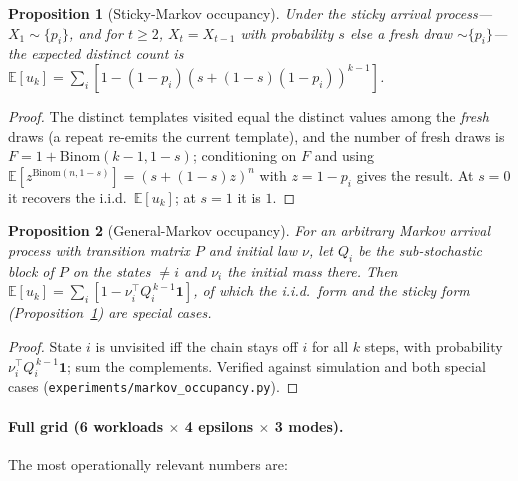 \documentclass[sigconf,nonacm]{acmart}
\newcommand{\E}{\mathbb{E}}
\newtheorem{prop}{Proposition}
\begin{document}
\begin{prop}[Sticky-Markov occupancy]\label{prop:sticky}
Under the sticky arrival process---$X_1\sim\{p_i\}$, and for $t\ge2$, $X_t{=}X_{t-1}$ with probability $s$ else a fresh draw $\sim\{p_i\}$---the expected distinct count is
$\E[u_k]=\sum_i[1-(1-p_i)(s+(1-s)(1-p_i))^{k-1}]$.
\end{prop}
\begin{proof}
The distinct templates visited equal the distinct values among the \emph{fresh} draws (a repeat re-emits the current template), and the number of fresh draws is $F=1+\mathrm{Binom}(k-1,1-s)$; conditioning on $F$ and using $\E[z^{\mathrm{Binom}(n,1-s)}]=(s+(1-s)z)^n$ with $z{=}1-p_i$ gives the result. At $s{=}0$ it recovers the i.i.d.\ $\E[u_k]$; at $s{=}1$ it is $1$. \end{proof}

\begin{prop}[General-Markov occupancy]\label{prop:markov}
For an arbitrary Markov arrival process with transition matrix $P$ and initial law $\nu$, let $Q_i$ be the sub-stochastic block of $P$ on the states $\neq i$ and $\nu_i$ the initial mass there. Then $\E[u_k]=\sum_i[1-\nu_i^{\!\top}Q_i^{\,k-1}\mathbf 1]$, of which the i.i.d.\ form and the sticky form (Proposition~\ref{prop:sticky}) are special cases.
\end{prop}
\begin{proof}
State $i$ is unvisited iff the chain stays off $i$ for all $k$ steps, with probability $\nu_i^{\!\top}Q_i^{\,k-1}\mathbf 1$; sum the complements. Verified against simulation and both special cases (\texttt{experiments/markov\_occupancy.py}). \end{proof}

\paragraph{Full grid (6 workloads $\times$ 4 epsilons $\times$ 3 modes).} The most operationally relevant numbers are:
\end{document}
